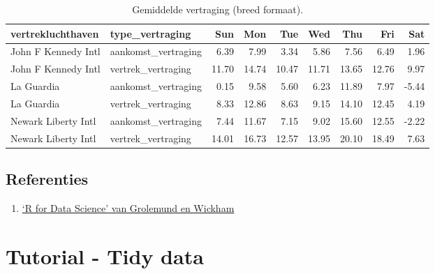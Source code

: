 \documentclass[]{tufte-book}
\newenvironment{Shaded}{}{}
\newcommand{\DataTypeTok}[1]{\textcolor[rgb]{0.56,0.13,0.00}{#1}}
\newcommand{\KeywordTok}[1]{\textcolor[rgb]{0.00,0.44,0.13}{\textbf{#1}}}
\newcommand{\NormalTok}[1]{#1}
\newcommand{\OperatorTok}[1]{\textcolor[rgb]{0.40,0.40,0.40}{#1}}
\newcommand{\StringTok}[1]{\textcolor[rgb]{0.25,0.44,0.63}{#1}}
\providecommand{\tightlist}{%
  \setlength{\itemsep}{0pt}\setlength{\parskip}{0pt}}
\begin{document}
\begin{Shaded}
\end{Shaded}

\begin{table}

\caption{\label{tab:7-15b}Gemiddelde vertraging (breed formaat).}
\centering
\fontsize{10}{12}\selectfont
\begin{tabular}[t]{llrrrrrrr}
\toprule
vertrekluchthaven & type\_vertraging & Sun & Mon & Tue & Wed & Thu & Fri & Sat\\
\midrule
John F Kennedy Intl & aankomst\_vertraging & 6.39 & 7.99 & 3.34 & 5.86 & 7.56 & 6.49 & 1.96\\
John F Kennedy Intl & vertrek\_vertraging & 11.70 & 14.74 & 10.47 & 11.71 & 13.65 & 12.76 & 9.97\\
La Guardia & aankomst\_vertraging & 0.15 & 9.58 & 5.60 & 6.23 & 11.89 & 7.97 & -5.44\\
La Guardia & vertrek\_vertraging & 8.33 & 12.86 & 8.63 & 9.15 & 14.10 & 12.45 & 4.19\\
Newark Liberty Intl & aankomst\_vertraging & 7.44 & 11.67 & 7.15 & 9.02 & 15.60 & 12.55 & -2.22\\
\addlinespace
Newark Liberty Intl & vertrek\_vertraging & 14.01 & 16.73 & 12.57 & 13.95 & 20.10 & 18.49 & 7.63\\
\bottomrule
\end{tabular}
\end{table}

\hypertarget{referenties-4}{%
\section{Referenties}\label{referenties-4}}

\begin{enumerate}
\def\labelenumi{\arabic{enumi}.}
\tightlist
\item
  \href{http://r4ds.had.co.nz/}{`R for Data Science' van Grolemund en Wickham}
\end{enumerate}

\hypertarget{tutorial---tidy-data}{%
\chapter{Tutorial - Tidy data}\label{tutorial---tidy-data}}
\end{document}
